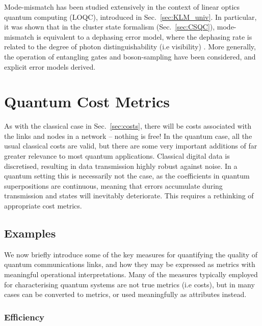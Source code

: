 \documentclass[aps,rmp,twocolumn,amsmath,amssymb,nofootinbib,superscriptaddress]{revtex4}
\begin{document}
Mode-mismatch has been studied extensively in the context of linear optics quantum computing (LOQC), introduced in Sec.~\ref{sec:KLM_univ}. In particular, it was shown that in the cluster state formalism (Sec.~\ref{sec:CSQC}), mode-mismatch is equivalent to a dephasing error model, where the dephasing rate is related to the degree of photon distinguishability (i.e visibility) \cite{bib:RohdeRalph06}. More generally, the operation of entangling gates \cite{bib:RohdeFreqTemp05, bib:RohdeGateChar05, bib:RohdeOptPhot05, bib:RohdeTimeRes11} and boson-sampling \cite{bib:RohdeArbSpec15, bib:RohdeArbLow12} have been considered, and explicit error models derived.

%
%

\section{Quantum Cost Metrics} \label{sec:quantum_meas_cost}

As with the classical case in Sec.~\ref{sec:costs}, there will be costs associated with the links and nodes in a network -- nothing is free! In the quantum case, all the usual classical costs are valid, but there are some very important additions of far greater relevance to most quantum applications. Classical digital data is discretised, resulting in data transmission highly robust against noise. In a quantum setting this is necessarily not the case, as the coefficients in quantum superpositions are continuous, meaning that errors accumulate during transmission and states will inevitably deteriorate. This requires a rethinking of appropriate cost metrics.

%
%

\subsection{Examples} \label{sec:sig_errs}

We now briefly introduce some of the key measures for quantifying the quality of quantum communications links, and how they may be expressed as metrics with meaningful operational interpretations. Many of the measures typically employed for characterising quantum systems are not true metrics (i.e costs), but in many cases can be converted to metrics, or used meaningfully as attributes instead.

%
%

\subsubsection{Efficiency}
\end{document}
